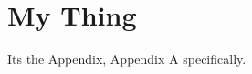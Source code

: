 %
%
%



\pagestyle{plain}
\setcounter{chapter}{0}
\appendix
\chapter{My Thing} \label{chap:boerasAppendix}
\renewcommand{\thetable}{\Alph{chapter}.\arabic{table}}  
\renewcommand{\thefigure}{\Alph{chapter}.\arabic{figure}} 

Its the Appendix, Appendix A specifically.